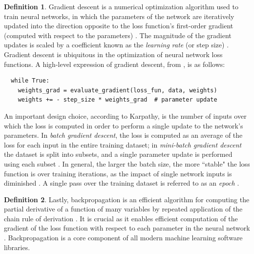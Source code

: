 \documentclass[12pt, titlepage]{report}
\theoremstyle{definition}
\newtheorem{definition}{Definition}
\begin{document}
\begin{definition}
Gradient descent is a numerical optimization algorithm used to train neural networks, in which the parameters of the network are iteratively updated into the direction opposite to the loss function's first-order gradient (computed with respect to the parameters) \cite[Optimization: Stochastic Gradient Descent]{karpathy2017cs231n}. The magnitude of the gradient updates is scaled by a coefficient known as the \emph{learning rate} (or step size) \cite[Optimization: Stochastic Gradient Descent]{karpathy2017cs231n}. Gradient descent is ubiquitous in the optimization of neural network loss functions. A high-level expression of gradient descent, from \cite{karpathy2017cs231n}, is as follows:

\begin{verbatim}
  while True:
    weights_grad = evaluate_gradient(loss_fun, data, weights)
    weights += - step_size * weights_grad  # parameter update
\end{verbatim}
\end{definition}

An important design choice, according to Karpathy, is the number of inputs over which the loss is computed in order to perform a single update to the network's parameters. In \emph{batch gradient descent}, the loss is computed as an average of the loss for each input in the entire training dataset; in \emph{mini-batch gradient descent} the dataset is split into subsets, and a single parameter update is performed using each subset \cite[Optimization: Stochastic Gradient Descent]{karpathy2017cs231n}. In general, the larger the batch size, the more ``stable" the loss function is over training iterations, as the impact of single network inputs is diminished \cite[Neural Networks Part 3: Learning and Evaluation]{karpathy2017cs231n}. A single pass over the training dataset is referred to as an \emph{epoch} \cite[Neural Networks Part 3: Learning and Evaluation]{karpathy2017cs231n}.

\begin{definition}
Lastly, backpropagation is an efficient algorithm for computing the partial derivative of a function of many variables by repeated application of the chain rule of derivation \cite[Backpropagation, Intuitions]{karpathy2017cs231n}. It is crucial as it enables efficient computation of the gradient of the loss function with respect to each parameter in the neural network \cite[Backpropagation, Intuitions]{karpathy2017cs231n}. Backpropagation is a core component of all modern machine learning software libraries.
\end{definition}
\end{document}
